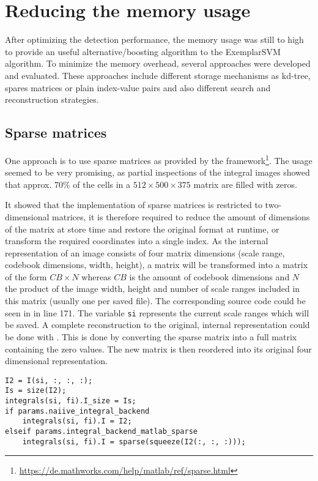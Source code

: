 \section{Reducing the memory usage}
\label{sec:reducing_memory}

After optimizing the detection performance, the memory usage was still to high to provide an useful alternative/boosting algorithm to the ExemplarSVM algorithm. To minimize the memory overhead, several approaches were developed and evaluated. These approaches include different storage mechanisms as kd-tree, spares matrices or plain index-value pairs and also different search and reconstruction strategies.

\subsection{Sparse matrices}

One approach is to use sparse matrices as provided by the \MATLAB framework\footnote{\url{https://de.mathworks.com/help/matlab/ref/sparse.html}}. The usage seemed to be very promising, as partial inspections of the integral images showed that approx. 70\% of the cells in a $512\times500\times375$ matrix are filled with zeros.

It showed that the \MATLAB implementation of sparse matrices is restricted to two-dimensional matrices, it is therefore required to reduce the amount of dimensions of the matrix at store time and restore the original format at runtime, or transform the required coordinates into a single index. As the internal representation of an image consists of four matrix dimensions (scale range, codebook dimensions, width, height), a matrix will be transformed into a matrix of the form $CB \times N$ whereas $CB$ is the amount of codebook dimensions and $N$ the product of the image width, height and number of scale ranges included in this matrix (usually one per saved \MATLAB file). The corresponding source code could be seen in  in line 171. The variable \verb|si| represents the current scale ranges which will be saved. A complete reconstruction to the original, internal representation could be done with . This is done by converting the sparse matrix into a full matrix containing the zero values. The new matrix is then reordered into its original four dimensional representation.

\begin{lstlisting}[firstnumber=165,caption={Sparse storage method (get\_codebook\_integrals.m)},label=lst:storage_method_sparse]
I2 = I(si, :, :, :);
Is = size(I2);
integrals(si, fi).I_size = Is;
if params.naiive_integral_backend
    integrals(si, fi).I = I2;
elseif params.integral_backend_matlab_sparse
    integrals(si, fi).I = sparse(squeeze(I2(:, :, :)));
\end{lstlisting}

